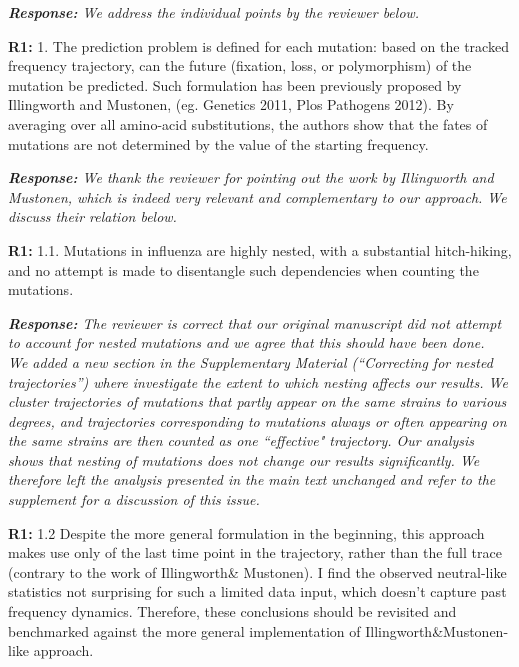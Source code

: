 \documentclass[aps,rmp,onecolumn]{revtex4-1}
\newcommand{\refa}[1]{\textbf{R1:} #1\vskip 5mm}
\newcommand{\response}[1]{{\it {\color{response}\textbf{Response:} #1}}\vskip 5mm}
\begin{document}
\response{We address the individual points by the reviewer below.}

\refa{1. The prediction problem is defined for each mutation: based on the
tracked frequency trajectory, can the future (fixation, loss, or
polymorphism) of the mutation be predicted. Such formulation has been
previously proposed by Illingworth and Mustonen, (eg. Genetics 2011,
Plos Pathogens 2012). By averaging over all amino-acid substitutions,
the authors show that the fates of mutations are not determined by the
value of the starting frequency.}

\response{We thank the reviewer for pointing out the work by Illingworth and Mustonen, which is indeed very relevant and complementary to our approach.
We discuss their relation below. }


\refa{1.1. Mutations in influenza are highly nested, with a substantial
hitch-hiking, and no attempt is made to disentangle such dependencies when counting the mutations.}

\response{
The reviewer is correct that our original manuscript did not attempt to account for nested mutations and we agree that this should have been done. \\
We added a new section in the Supplementary Material (``Correcting for nested trajectories'') where investigate the extent to which nesting affects our results.
We cluster trajectories of mutations that partly appear on the same strains to various degrees, and trajectories corresponding to mutations always or often appearing on the same strains are then counted as one ``effective" trajectory.
Our analysis shows that nesting of mutations does not change our results significantly.
We therefore left the analysis presented in the main text unchanged and refer to the supplement for a discussion of this issue.
}

\refa{1.2 Despite the more general formulation in the beginning, this
approach makes use only of the last time point in the trajectory,
rather than the full trace (contrary to the work of Illingworth\&
Mustonen). I find the observed neutral-like statistics not surprising
for such a limited data input, which doesn't capture past frequency dynamics. Therefore, these conclusions should be
revisited and benchmarked against the more general implementation of Illingworth\&Mustonen-like approach.}
\end{document}
